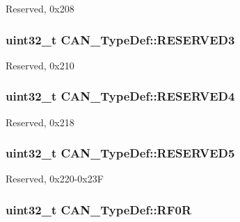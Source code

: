 Reserved, 0x208 \hypertarget{struct_c_a_n___type_def_af730af32307f845895465e8ead57d20c}{
\subsubsection[{R\-E\-S\-E\-R\-V\-E\-D3}]{\setlength{\rightskip}{0pt plus 5cm}uint32\-\_\-t C\-A\-N\-\_\-\-Type\-Def\-::\-R\-E\-S\-E\-R\-V\-E\-D3}}\label{struct_c_a_n___type_def_af730af32307f845895465e8ead57d20c}
Reserved, 0x210 \hypertarget{struct_c_a_n___type_def_a51c408c7c352b8080f0c6d42bf811d43}{
\subsubsection[{R\-E\-S\-E\-R\-V\-E\-D4}]{\setlength{\rightskip}{0pt plus 5cm}uint32\-\_\-t C\-A\-N\-\_\-\-Type\-Def\-::\-R\-E\-S\-E\-R\-V\-E\-D4}}\label{struct_c_a_n___type_def_a51c408c7c352b8080f0c6d42bf811d43}
Reserved, 0x218 \hypertarget{struct_c_a_n___type_def_a05b74b369ea3d9489caa4427c034c2a3}{
\subsubsection[{R\-E\-S\-E\-R\-V\-E\-D5}]{\setlength{\rightskip}{0pt plus 5cm}uint32\-\_\-t C\-A\-N\-\_\-\-Type\-Def\-::\-R\-E\-S\-E\-R\-V\-E\-D5}}\label{struct_c_a_n___type_def_a05b74b369ea3d9489caa4427c034c2a3}
Reserved, 0x220-\/0x23\-F \hypertarget{struct_c_a_n___type_def_ad8e858479e26ab075ee2ddb630e8769d}{
\subsubsection[{R\-F0\-R}]{ uint32\-\_\-t C\-A\-N\-\_\-\-Type\-Def\-::\-R\-F0\-R}}\label{struct_c_a_n___type_def_ad8e858479e26ab075ee2ddb630e8769d}
